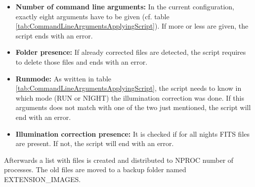 \begin{itemize}
\item \textbf{Number of command line arguments:} In the current configuration, exactly eight arguments have to be given (cf. table \ref{tab:CommandLineArgumentsApplyingScript}). If more or less are given, the script ends with an error.
\item \textbf{Folder presence:} If already corrected files are detected, the script requires to delete those files and ends with an error.
\item \textbf{Runmode:} As written in table \ref{tab:CommandLineArgumentsApplyingScript}, the script needs to know in which mode (RUN or NIGHT) the illumination correction was done. If this arguments does not match with one of the two just mentioned, the script will end with an error.
\item \textbf{Illumination correction presence:} It is checked if for all nights FITS files are present. If not, the script will end with an error.
\end{itemize}
Afterwards a list with files is created and distributed to NPROC number of processes. The old files are moved to a backup folder named EXTENSION\_IMAGES.
